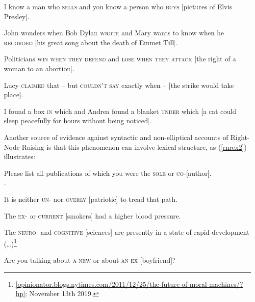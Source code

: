 \documentclass[output=paper
                ,modfonts
                ,nonflat
	        ,collection
	        ,collectionchapter
	        ,collectiontoclongg
 	        ,biblatex
                ,babelshorthands
                ,newtxmath
                ,draftmode
                ,colorlinks, citecolor=brown
]{./langsci/langscibook}
\begin{document}
\begin{exe}
\ex
\begin{xlista}
\ex  I know a man who \textsc{sells} and you know a person who \textsc{buys}
                     [pictures of Elvis Presley].

\ex John wonders when Bob Dylan
\textsc{wrote} and Mary wants to know when
  he
\textsc{recorded} [his great song about the death of Emmet Till].
 
 \ex Politicians \textsc{win when they defend} and \textsc{lose when they attack}
[the right of a woman to an abortion].

\ex Lucy \textsc{claimed} that -- but \textsc{couldn't say}
exactly when --  $[$the strike would take place$]$.
 
 \ex I found a box \textsc{in} which and Andrea found a blanket \textsc{under}
which [a cat could sleep peacefully for hours without being
noticed].
\end{xlista}\label{rnrex1}
\end{exe}

Another source of evidence against syntactic and non-elliptical accounts of Right-Node Raising is that this phenomenon can involve lexical structure,
as  (\ref{rnrex2}) illustrates:


\begin{exe}
\ex \begin{xlista}
\ex Please list all publications of which you were the \textsc{sole} or
\textsc{co}-[author].\\
 \citep[1325, footnote 44]{rodney2}.
 
\ex  It is neither \textsc{un}- nor \textsc{overly} [patriotic] to tread that path.
 
\ex The \textsc{ex-} or \textsc{current} [smokers] had a higher blood pressure.\\
\citep{chaveslp} 

\ex The \textsc{neuro}- and \textsc{cognitive} [sciences] are
presently in a state of rapid development (\ldots{})\footnote{\url{[opinionator.blogs.nytimes.com/2011/12/25/the-future-of-moral-machines/?hp]}; November 13th 2019.}

\ex Are you talking about \textsc{a new}  or about \textsc{an ex}-[boyfriend]?

\end{xlista}\label{rnrex2}
\end{exe}
\end{document}

